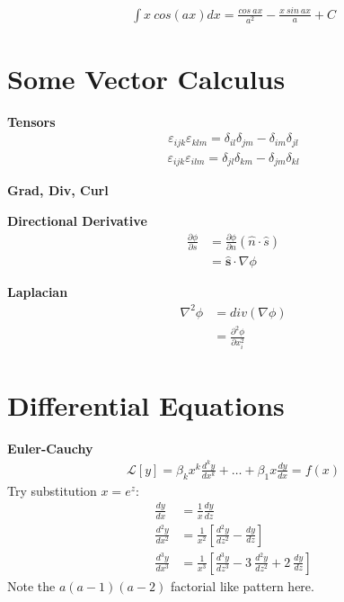 \documentclass{article}
\begin{document}
\begin{align*}
    \int x \ cos(ax) dx = \frac{cos \ ax}{a^2} - \frac{x \ sin \ ax}{a}+ C
\end{align*}
\newline

\section{Some Vector Calculus}
\Large \textbf{Tensors}
\begin{align*}
    \varepsilon_{ijk} \varepsilon_{klm} = \delta_{il} \delta_{jm} - \delta_{im} \delta_{jl}
\end{align*}
\begin{align*}
    \varepsilon_{ijk} \varepsilon_{ilm} = \delta_{jl} \delta_{km} - \delta_{jm} \delta_{kl}
\end{align*}
\newline


\noindent
\Large{\textbf{Grad, Div, Curl}}
\newline

\textbf{Directional Derivative}
\begin{align*}
    \frac{\partial \phi}{\partial s} &= \frac{\partial \phi}{\partial n} (\hat{n} \cdot  \hat{s}) \\
                                     &= \mathbf{\hat{s}} \cdot \nabla \phi
\end{align*}

\textbf{Laplacian}
\begin{align*}
    \nabla^2 \phi &= div(\nabla \phi) \\
                  &= \frac{\partial^2 \phi }{\partial x_i^2}
\end{align*}

\section{Differential Equations}

\textbf{Euler-Cauchy}
\begin{align*}
    \mathcal{L}[y] = \beta_{k}x^k \frac{d^ky}{dx^k} + \dots + \beta_{1} x \frac{dy}{dx} = f(x) 
\end{align*}
Try substitution $x=e^z$:
\begin{align*}
    \frac{dy}{dx} &= \frac{1}{x} \frac{dy}{dz} \\
    \frac{d^2y}{dx^2} &= \frac{1}{x^2} [\frac{d^2y}{dz^2}-\frac{dy}{dz}] \\
    \frac{d^3y}{dx^3} &= \frac{1}{x^3} [\frac{d^3y}{dz^3}-3 \ \frac{d^2y}{dz^2}+2 \ \frac{dy}{dz}]
\end{align*}
Note the $a(a-1)(a-2)$ factorial like pattern here.
\end{document}
